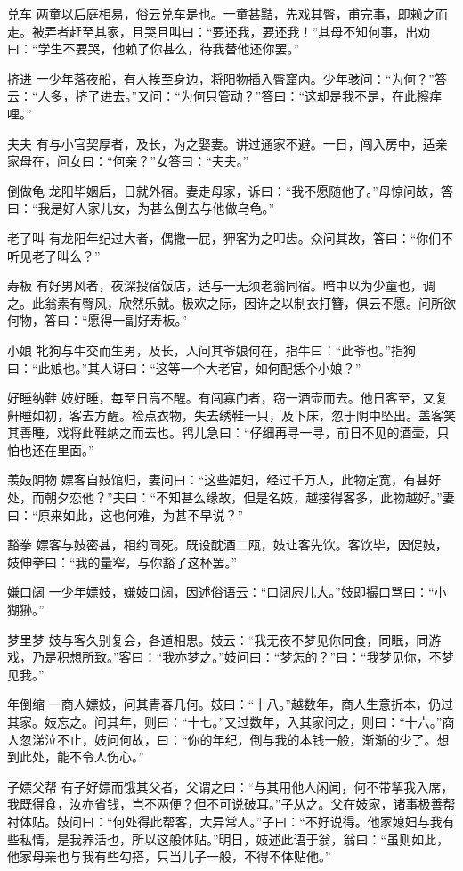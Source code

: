 \documentclass[12pt,UTF8]{ctexbook}
\begin{document}
兑车
两童以后庭相易，俗云兑车是也。一童甚黠，先戏其臀，甫完事，即赖之而走。被弄者赶至其家，且哭且叫曰：“要还我，要还我！”其母不知何事，出劝曰：“学生不要哭，他赖了你甚么，待我替他还你罢。”

挤进
一少年落夜船，有人挨至身边，将阳物插入臀窟内。少年骇问：“为何？”答云：“人多，挤了进去。”又问：“为何只管动？”答曰：“这却是我不是，在此擦痒哩。”

夫夫
有与小官契厚者，及长，为之娶妻。讲过通家不避。一日，闯入房中，适亲家母在，问女曰：“何亲？”女答曰：“夫夫。”

倒做龟
龙阳毕姻后，日就外宿。妻走母家，诉曰：“我不愿随他了。”母惊问故，答曰：“我是好人家儿女，为甚么倒去与他做乌龟。”

老了叫
有龙阳年纪过大者，偶撒一屁，狎客为之叩齿。众问其故，答曰：“你们不听见老了叫么？”

寿板
有好男风者，夜深投宿饭店，适与一无须老翁同宿。暗中以为少童也，调之。此翁素有臀风，欣然乐就。极欢之际，因许之以制衣打簪，俱云不愿。问所欲何物，答曰：“愿得一副好寿板。”

小娘
牝狗与牛交而生男，及长，人问其爷娘何在，指牛曰：“此爷也。”指狗曰：“此娘也。”其人讶曰：“这等一个大老官，如何配恁个小娘？”

好睡纳鞋
妓好睡，每至日高不醒。有闯寡门者，窃一酒壶而去。他日客至，又复鼾睡如初，客去方醒。检点衣物，失去绣鞋一只，及下床，忽于阴中坠出。盖客笑其善睡，戏将此鞋纳之而去也。鸨儿急曰：“仔细再寻一寻，前日不见的酒壶，只怕也还在里面。”

羡妓阴物
嫖客自妓馆归，妻问曰：“这些娼妇，经过千万人，此物定宽，有甚好处，而朝夕恋他？”夫曰：“不知甚么缘故，但是名妓，越接得客多，此物越好。”妻曰：“原来如此，这也何难，为甚不早说？”

豁拳
嫖客与妓密甚，相约同死。既设酖酒二瓯，妓让客先饮。客饮毕，因促妓，妓伸拳曰：“我的量窄，与你豁了这杯罢。”

嫌口阔
一少年嫖妓，嫌妓口阔，因述俗语云：“口阔屄儿大。”妓即撮口骂曰：“小猢狲。”

梦里梦
妓与客久别复会，各道相思。妓云：“我无夜不梦见你同食，同眠，同游戏，乃是积想所致。”客曰：“我亦梦之。”妓问曰：“梦怎的？”曰：“我梦见你，不梦见我。”

年倒缩
一商人嫖妓，问其青春几何。妓曰：“十八。”越数年，商人生意折本，仍过其家。妓忘之。问其年，则曰：“十七。”又过数年，入其家问之，则曰：“十六。”商人忽涕泣不止，妓问何故，曰：“你的年纪，倒与我的本钱一般，渐渐的少了。想到此处，能不令人伤心。”

子嫖父帮
有子好嫖而饿其父者，父谓之曰：“与其用他人闲闻，何不带挈我入席，我既得食，汝亦省钱，岂不两便？但不可说破耳。”子从之。父在妓家，诸事极善帮衬体贴。妓问曰：“何处得此帮客，大异常人。”子曰：“不好说得。他家媳妇与我有些私情，是我养活也，所以这般体贴。”明日，妓述此语于翁，翁曰：“虽则如此，他家母亲也与我有些勾搭，只当儿子一般，不得不体贴他。”
\end{document}
